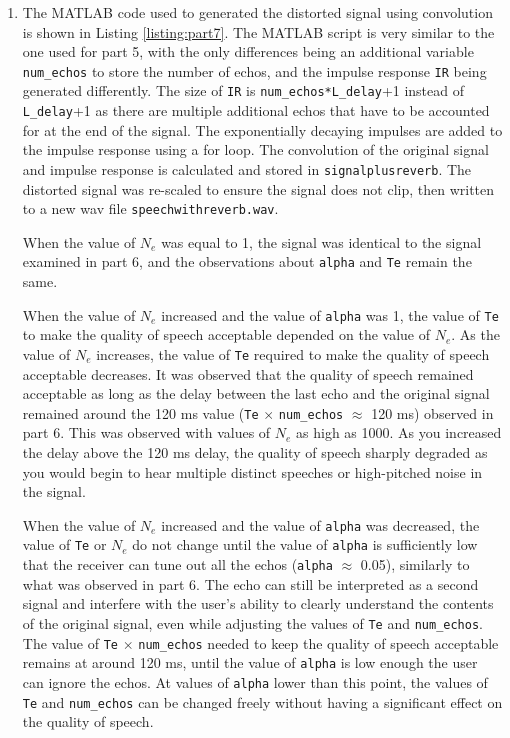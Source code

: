 \documentclass[12pt]{article}
\begin{document}
\begin{enumerate}
    \item
    The MATLAB code used to generated the distorted signal using convolution is shown in Listing \ref{listing:part7}. The MATLAB script is very similar to the one used for part 5, with the only differences being an additional variable \verb|num_echos| to store the number of echos, and the impulse response \verb|IR| being generated differently. The size of \verb|IR| is \verb|num_echos*L_delay|+1 instead of \verb|L_delay|+1 as there are multiple additional echos that have to be accounted for at the end of the signal. The exponentially decaying impulses are added to the impulse response using a for loop. The convolution of the  original signal and impulse response is calculated and stored in \verb|signalplusreverb|.  The distorted signal was re-scaled to ensure the signal does not clip, then written to a new wav file \verb|speechwithreverb.wav|. 

    

    When the value of $N_e$ was equal to 1, the signal was identical to the signal examined in part 6, and the observations about \verb|alpha| and \verb|Te| remain the same.

    When the value of $N_e$ increased and the value of \verb|alpha| was 1, the value of \verb|Te| to make the quality of speech acceptable depended on the value of $N_e$. As the value of $N_e$ increases, the value of \verb|Te| required to make the quality of speech acceptable decreases. It was observed that the quality of speech remained acceptable as long as the delay between the last echo and the original signal remained around the 120 ms value (\verb|Te| $\times$ \verb|num_echos| $\approx$ 120 ms) observed in part 6. This was observed with values of $N_e$ as high as 1000. As you increased the delay above the 120 ms delay, the quality of speech sharply degraded as you would begin to hear multiple distinct speeches or high-pitched noise in the signal.
    
    When the value of $N_e$ increased and the value of \verb|alpha| was decreased, the value of \verb|Te| or $N_e$ do not change until the value of \verb|alpha| is sufficiently low that the receiver can tune out all the echos (\verb|alpha| $\approx$ 0.05), similarly to what was observed in part 6. The echo can still be interpreted as a second signal and interfere with the user's ability to clearly understand the contents of the original signal, even while adjusting the values of \verb|Te| and \verb|num_echos|. The value of \verb|Te| $\times$ \verb|num_echos| needed to keep the quality of speech acceptable remains at around 120 ms, until the value of \verb|alpha| is low enough the user can ignore the echos. At values of \verb|alpha| lower than this point, the values of \verb|Te| and \verb|num_echos| can be changed freely without having a significant effect on the quality of speech.
\end{enumerate}
\end{document}
